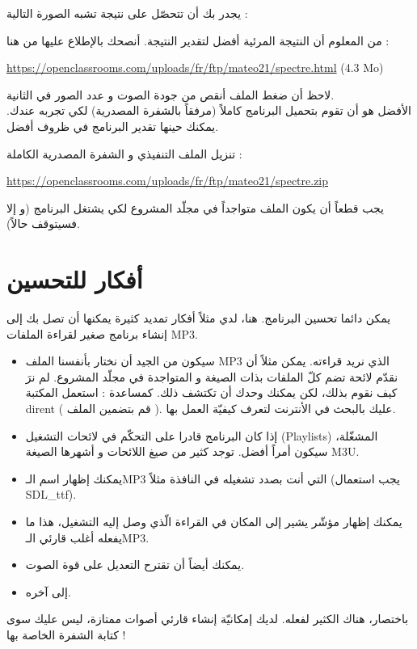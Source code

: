يجدر بك أن تتحصّل على نتيجة تشبه الصورة التالية :


من المعلوم أن النتيجة المرئية أفضل لتقدير النتيجة. أنصحك بالإطلاع عليها من هنا :

\textenglish{\url{https://openclassrooms.com/uploads/fr/ftp/mateo21/spectre.html} (4.3 Mo)}

لاحظ أن ضغط الملف أنقص من جودة الصوت و عدد الصور في الثانية.\\
الأفضل هو أن تقوم بتحميل البرنامج كاملاً (مرفقاً بالشفرة المصدرية) لكي تجربه عندك. يمكنك حينها تقدير البرنامج في ظروف أفضل.

تنزيل الملف التنفيذي و الشفرة المصدرية الكاملة :

\url{https://openclassrooms.com/uploads/fr/ftp/mateo21/spectre.zip}

\begin{critical}
يجب قطعاً أن يكون الملف
متواجداً في مجلّد المشروع لكي يشتغل البرنامج (و إلا فسيتوقف حالاً).
\end{critical}

\section*{أفكار للتحسين}

يمكن دائما تحسين البرنامج. هنا، لدي مثلاً أفكار تمديد كثيرة يمكنها أن تصل بك إلى إنشاء برنامج صغير لقراءة الملفات
\textenglish{MP3}.

\begin{itemize}
	\item سيكون من الجيد أن نختار بأنفسنا الملف
	\textenglish{MP3}
	الذي نريد قراءته. يمكن مثلاً أن نقدّم لائحة تضم كلّ الملفات بذات الصيغة و المتواجدة في مجلّد المشروع. لم نرَ كيف نقوم بذلك، لكن يمكنك وحدك أن تكتشف ذلك. كمساعدة : استعمل المكتبة
	\textenglish{dirent}
	( قم بتضمين الملف 
	).
	عليك بالبحث في الأنترنت لتعرف كيفيّة العمل بها.
	\item إذا كان البرنامج قادرا على التحكّم في لائحات التشغيل
	(\textenglish{Playlists})
	المشغّلة، سيكون أمراً أفضل. توجد كثير من صيغ اللائحات و أشهرها الصيغة
	\textenglish{M3U}.
	\item يمكنك إظهار اسم الـ\textenglish{MP3}
	التي أنت بصدد تشغيله في النافذة مثلاً (يجب استعمال
	\textenglish{SDL\_ttf}).
	\item يمكنك إظهار مؤشّر يشير إلى المكان في القراءة الّذي وصل إليه التشغيل، هذا ما يفعله أغلب قارئي الـ\textenglish{MP3}.
	\item يمكنك أيضاً أن تقترح التعديل على قوة الصوت.
	\item إلى آخره.
\end{itemize}

باختصار، هناك الكثير لفعله. لديك إمكانيّة إنشاء قارئي أصوات ممتازة، ليس عليك سوى كتابة الشفرة الخاصة بها !
